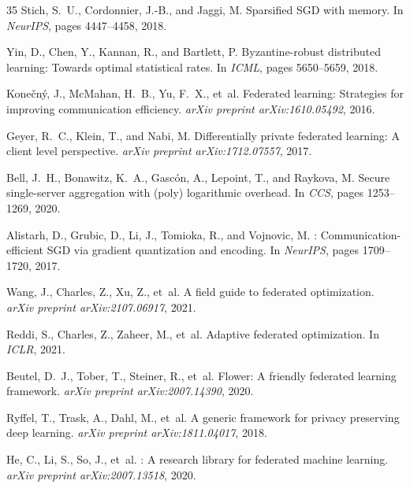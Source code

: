 \documentclass[11pt,a4paper]{article}
\begin{document}
\begin{thebibliography}{35}
Stich, S.~U., Cordonnier, J.-B., and Jaggi, M.
\newblock Sparsified {SGD} with memory.
\newblock In \emph{NeurIPS}, pages 4447--4458, 2018.

Yin, D., Chen, Y., Kannan, R., and Bartlett, P.
\newblock Byzantine-robust distributed learning: Towards optimal statistical rates.
\newblock In \emph{ICML}, pages 5650--5659, 2018.

Kone\v{c}n\'y, J., McMahan, H.~B., Yu, F.~X., et~al.
\newblock Federated learning: Strategies for improving communication efficiency.
\newblock \emph{arXiv preprint arXiv:1610.05492}, 2016.

Geyer, R.~C., Klein, T., and Nabi, M.
\newblock Differentially private federated learning: A client level perspective.
\newblock \emph{arXiv preprint arXiv:1712.07557}, 2017.

Bell, J.~H., Bonawitz, K.~A., Gasc\'on, A., Lepoint, T., and Raykova, M.
\newblock Secure single-server aggregation with (poly) logarithmic overhead.
\newblock In \emph{CCS}, pages 1253--1269, 2020.

Alistarh, D., Grubic, D., Li, J., Tomioka, R., and Vojnovic, M.
: Communication-efficient {SGD} via gradient quantization and encoding.
\newblock In \emph{NeurIPS}, pages 1709--1720, 2017.

Wang, J., Charles, Z., Xu, Z., et~al.
\newblock A field guide to federated optimization.
\newblock \emph{arXiv preprint arXiv:2107.06917}, 2021.

Reddi, S., Charles, Z., Zaheer, M., et~al.
\newblock Adaptive federated optimization.
\newblock In \emph{ICLR}, 2021.

Beutel, D.~J., Tober, T., Steiner, R., et~al.
\newblock Flower: A friendly federated learning framework.
\newblock \emph{arXiv preprint arXiv:2007.14390}, 2020.

Ryffel, T., Trask, A., Dahl, M., et~al.
\newblock A generic framework for privacy preserving deep learning.
\newblock \emph{arXiv preprint arXiv:1811.04017}, 2018.

He, C., Li, S., So, J., et~al.
: A research library for federated machine learning.
\newblock \emph{arXiv preprint arXiv:2007.13518}, 2020.


\end{thebibliography}
\end{document}
